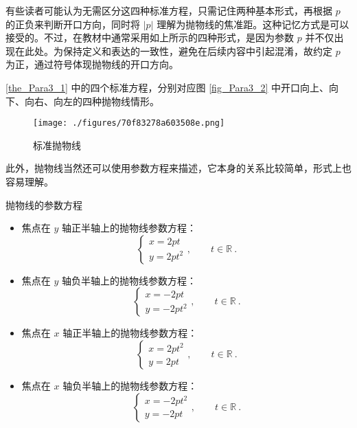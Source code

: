 有些读者可能认为无需区分这四种标准方程，只需记住两种基本形式，再根据 $p$ 的正负来判断开口方向，同时将 $|p|$ 理解为抛物线的焦准距。这种记忆方式是可以接受的。不过，在教材中通常采用如上所示的四种形式，是因为参数 $p$ 并不仅出现在此处。为保持定义和表达的一致性，避免在后续内容中引起混淆，故约定 $p$ 为正，通过符号体现抛物线的开口方向。

\autoref{the_Para3_1} 中的四个标准方程，分别对应图 \autoref{fig_Para3_2} 中开口向上、向下、向右、向左的四种抛物线情形。

\begin{figure}[ht]
\centering
\texttt{[image: ./figures/70f83278a603508e.png]}
\caption{标准抛物线} \label{fig_Para3_2}
\end{figure}

此外，抛物线当然还可以使用参数方程来描述，它本身的关系比较简单，形式上也容易理解。

\begin{theorem}{抛物线的参数方程}
\begin{itemize}
\item 焦点在 $y$ 轴正半轴上的抛物线参数方程：
\begin{equation}\label{eq_Para3_4}
\begin{cases}
x = 2pt \\
y = 2pt^2
\end{cases},\qquad t \in \mathbb{R}~.
\end{equation}
\item 焦点在 $y$ 轴负半轴上的抛物线参数方程：
\begin{equation}
\begin{cases}
x = -2pt \\
y = -2pt^2
\end{cases},\qquad t \in \mathbb{R}~.
\end{equation}
\item 焦点在 $x$ 轴正半轴上的抛物线参数方程：
\begin{equation}
\begin{cases}
x = 2pt^2 \\
y = 2pt
\end{cases},\qquad t \in \mathbb{R}~.
\end{equation}
\item 焦点在 $x$ 轴负半轴上的抛物线参数方程：
\begin{equation}
\begin{cases}
x = -2pt^2 \\
y = -2pt
\end{cases},\qquad t \in \mathbb{R}~.
\end{equation}
\end{itemize}
\end{theorem}

